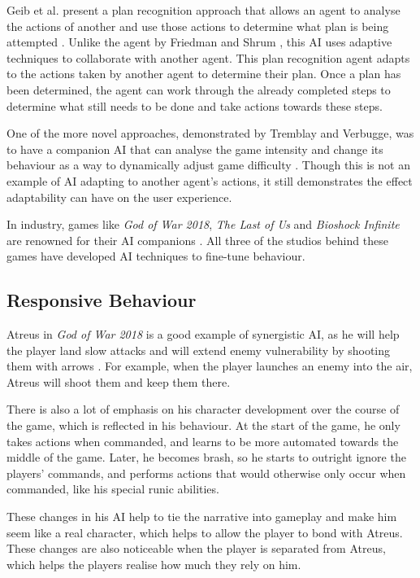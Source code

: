 \documentclass{IEEEtran}
\begin{document}
Geib et al. present a plan recognition approach that allows an agent to analyse the actions of another and use those actions to determine what plan is being attempted \cite{GeneratingCollabBehaviourPlanRecognition2016}. Unlike the agent by Friedman and Shrum \cite{CompanionBotsFPS2019}, this AI uses adaptive techniques to collaborate with another agent. This plan recognition agent adapts to the actions taken by another agent to determine their plan. Once a plan has been determined, the agent can work through the already completed steps to determine what still needs to be done and take actions towards these steps.

One of the more novel approaches, demonstrated by Tremblay and Verbugge, was to have a companion AI that can analyse the game intensity and change its behaviour as a way to dynamically adjust game difficulty \cite{tremblay2013adaptive}. Though this is not an example of AI adapting to another agent's actions, it still demonstrates the effect adaptability can have on the user experience.

In industry, games like \textit{God of War 2018}, \textit{The Last of Us} and \textit{Bioshock Infinite} are renowned for their AI companions \cite{PlayDontShow}. All three of the studios behind these games have developed AI techniques to fine-tune behaviour.

\subsection{Responsive Behaviour}
\label{Responsive Behaviour}

Atreus in \textit{God of War 2018} is a good example of synergistic AI, as he will help the player land slow attacks and will extend enemy vulnerability by shooting them with arrows \cite{GDCAtreus}. For example, when the player launches an enemy into the air, Atreus will shoot them and keep them there.

There is also a lot of emphasis on his character development over the course of the game, which is reflected in his behaviour. At the start of the game, he only takes actions when commanded, and learns to be more automated towards the middle of the game. Later, he becomes brash, so he starts to outright ignore the players’ commands, and performs actions that would otherwise only occur when commanded, like his special runic abilities.

These changes in his AI help to tie the narrative into gameplay and make him seem like a real character, which helps to allow the player to bond with Atreus. These changes are also noticeable when the player is separated from Atreus, which helps the players realise how much they rely on him.
\end{document}
